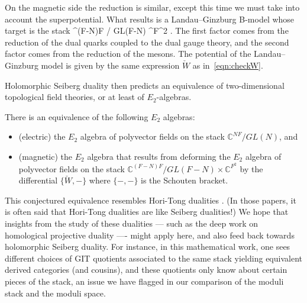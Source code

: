 \documentclass[11pt]{amsart}
\def\C{{\mathbb{C}}}
\begin{document}
On the magnetic side the reduction is similar, except this time we must take into account the superpotential. 
What results is a Landau--Ginzburg B-model whose target is the stack
\beqn
\C^{(F-N)F} / GL(F-N) \times \C^{F^2} .
\eeqn
The first factor comes from the reduction of the dual quarks coupled to the dual gauge theory, and the second factor comes from the reduction of the mesons. 
The potential of the Landau--Ginzburg model is given by the same expression $\check{W}$ as in~\eqref{eqn:checkW}.

Holomorphic Seiberg duality then predicts an equivalence of two-dimensional topological field theories,
or at least of $E_2$-algebras.

\begin{conj}
There is an equivalence of the following $E_2$ algebras:
\begin{itemize} 
\item (electric) the $E_2$ algebra of polyvector fields on the stack $\C^{NF} / GL(N)$, and 
\item (magnetic) the $E_2$ algebra that results from deforming the $E_2$ algebra of polyvector fields on the stack $\C^{(F-N)F} / GL(F-N) \times \C^{F^2}$ by the differential $\{\check{W},-\}$ where $\{-,-\}$ is the Schouten bracket.
\end{itemize}
\end{conj}


This conjectured equivalence resembles Hori-Tong dualities \cite{HoriTong, Hori, others}.
(In those papers, it is often said that Hori-Tong dualities are like Seiberg dualities!)
We hope that insights from the study of these dualities --- such as the deep work on homological projective duality \cite{Kuznetsov, Thomas, Segal, others} ---- might apply here, and also feed back towards holomorphic Seiberg duality.
For instance, in this mathematical work, 
one sees different choices of GIT quotients associated to the same stack yielding equivalent derived categories (and cousins),
and these quotients only know about certain pieces of the stack,
an issue we have flagged in our comparison of the moduli stack and the moduli space.
\end{document}

